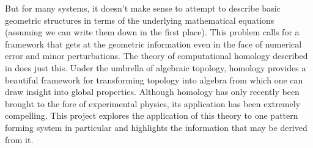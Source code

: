 	But for many systems, it doesn't make sense to attempt to describe basic geometric structures in terms of the underlying mathematical equations (assuming we can write them down in the first place). This problem calls for a framework that gets at the geometric information even in the face of numerical error and minor perturbations. The theory of computational homology described in  does just this. Under the umbrella of algebraic topology, homology provides a beautiful framework for transforming topology into algebra from which one can draw insight into global properties. Although homology has only recently been brought to the fore of experimental physics, its application has been extremely compelling. This project explores the application of this theory to one pattern forming system in particular and highlights the information that may be derived from it.
	
	
	
	
	
	